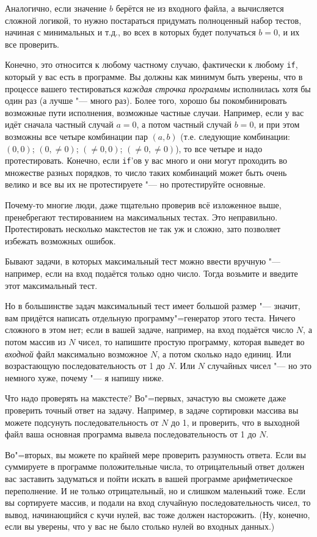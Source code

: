 \documentclass[a4paper,10pt]{problems}
\begin{document}
Аналогично, если значение $b$ берётся не из входного файла, а вычисляется сложной логикой, то нужно постараться придумать полноценный набор тестов,
начиная с минимальных и т.д., во всех в которых будет получаться $b=0$, и их все проверить.

Конечно, это относится к любому частному случаю, фактически к любому \verb`if`, который у вас есть в программе. 
Вы должны как минимум быть уверены, что в процессе вашего тестироваться \textit{каждая строчка программы} исполнилась хотя бы один раз (а лучше "--- много раз).
Более того, хорошо бы покомбинировать возможные пути исполнения, возможные частные случаи. 
Например, если у вас идёт сначала частный случай $a=0$, а потом частный случай $b=0$, и при этом возможны все четыре комбинации пар $(a,b)$ 
(т.е. следующие комбинации: $(0,0)$; $(0, {\neq} 0)$; $({\neq} 0, 0)$; $({\neq} 0, {\neq} 0)$), то все четыре и надо протестировать.
Конечно, если \verb`if`'ов у вас много и они могут проходить во множестве разных порядков, то число таких комбинаций может быть очень велико
и все вы их не протестируете "--- но протестируйте основные.

Почему-то многие люди, даже тщательно проверив всё изложенное выше, пренебрегают тестированием на максимальных тестах.
Это неправильно. Протестировать несколько макстестов не так уж и сложно, зато позволяет избежать возможных ошибок.

Бывают задачи, в которых максимальный тест можно ввести вручную "--- например, если на вход подаётся только одно число.
Тогда возьмите и введите этот максимальный тест.

Но в большинстве задач максимальный тест имеет большой размер "--- значит, вам придётся написать отдельную программу"=генератор этого теста. 
Ничего сложного в этом нет; если в вашей задаче, например, на вход подаётся число $N$, а потом массив из $N$ чисел, то напишите простую программу,
которая выведет во \textit{входной} файл максимально возможное $N$, а потом сколько надо единиц. 
Или возрастающую последовательность от 1 до $N$. 
Или $N$ случайных чисел "--- но это немного хуже, почему "--- я напишу ниже.

Что надо проверять на макстесте? 
Во"=первых, зачастую вы сможете даже проверить точный ответ на задачу. 
Например, в задаче сортировки массива вы можете подсунуть последовательность от $N$ до 1, и проверить, что в выходной файл ваша основная программа
вывела последовательность от 1 до $N$.

Во"=вторых, вы можете по крайней мере проверить разумность ответа. 
Если вы суммируете в программе положительные числа, то отрицательный ответ должен вас заставить задуматься и пойти искать в вашей программе арифметическое переполнение. И не только отрицательный, но и слишком маленький тоже. Если вы сортируете массив, и подали на вход случайную последовательность чисел, то вывод, начинающийся с кучи нулей, вас тоже должен насторожить. (Ну, конечно, если вы уверены, что у вас не было столько нулей во входных данных.)
\end{document}
